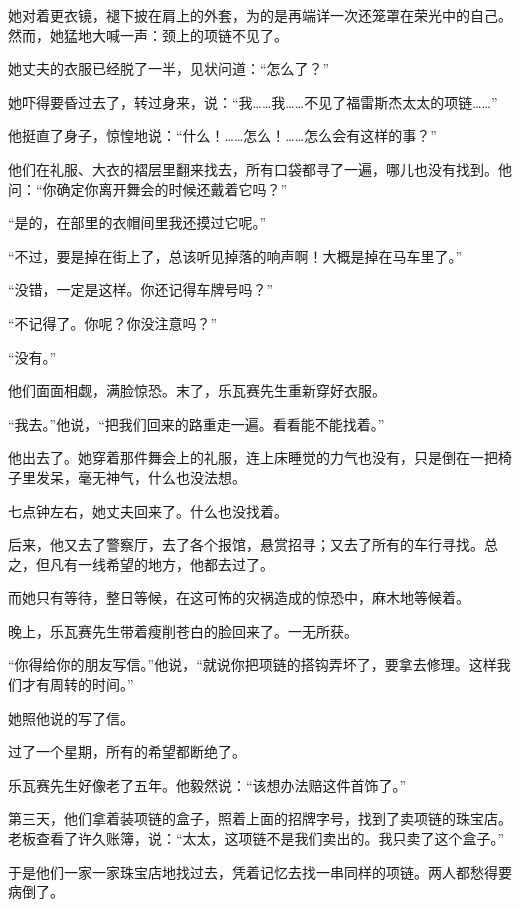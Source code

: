 \documentclass[12pt,UTF-8,openany]{ctexbook}
\begin{document}
\begin{normalsize}
    她对着更衣镜，褪下披在肩上的外套，为的是再端详一次还笼罩在荣光中的自己。然而，她猛地大喊一声：颈上的项链不见了。
    
    她丈夫的衣服已经脱了一半，见状问道：“怎么了？”
    
    她吓得要昏过去了，转过身来，说：“我……我……不见了福雷斯杰太太的项链……”
    
    他挺直了身子，惊惶地说：“什么！……怎么！……怎么会有这样的事？”
    
    他们在礼服、大衣的褶层里翻来找去，所有口袋都寻了一遍，哪儿也没有找到。他问：“你确定你离开舞会的时候还戴着它吗？”
    
    “是的，在部里的衣帽间里我还摸过它呢。”
    
    “不过，要是掉在街上了，总该听见掉落的响声啊！大概是掉在马车里了。”
    
    “没错，一定是这样。你还记得车牌号吗？”
    
    “不记得了。你呢？你没注意吗？”
    
    “没有。”
    
    他们面面相觑，满脸惊恐。末了，乐瓦赛先生重新穿好衣服。
    
    “我去。”他说，“把我们回来的路重走一遍。看看能不能找着。”
    
    他出去了。她穿着那件舞会上的礼服，连上床睡觉的力气也没有，只是倒在一把椅子里发呆，毫无神气，什么也没法想。
    
    七点钟左右，她丈夫回来了。什么也没找着。
    
    后来，他又去了警察厅，去了各个报馆，悬赏招寻；又去了所有的车行寻找。总之，但凡有一线希望的地方，他都去过了。
    
    而她只有等待，整日等候，在这可怖的灾祸造成的惊恐中，麻木地等候着。
    
    晚上，乐瓦赛先生带着瘦削苍白的脸回来了。一无所获。
    
    “你得给你的朋友写信。”他说，“就说你把项链的搭钩弄坏了，要拿去修理。这样我们才有周转的时间。”
    
    她照他说的写了信。
    
    过了一个星期，所有的希望都断绝了。
    
    乐瓦赛先生好像老了五年。他毅然说：“该想办法赔这件首饰了。”
    
    第三天，他们拿着装项链的盒子，照着上面的招牌字号，找到了卖项链的珠宝店。老板查看了许久账簿，说：“太太，这项链不是我们卖出的。我只卖了这个盒子。”
    
    于是他们一家一家珠宝店地找过去，凭着记忆去找一串同样的项链。两人都愁得要病倒了。
    

\end{normalsize}
\end{document}
